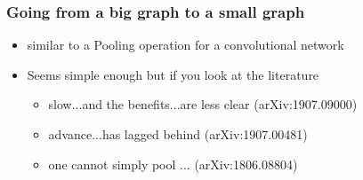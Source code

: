 \documentclass[hyperref={pdfpagelabels=false}]{beamer}
\begin{document}
\begin{frame}[label=Going from a big graph to a small graph]
\frametitle{Going from a big graph to a small graph}
\begin{itemize}

    \item similar to a Pooling operation for a convolutional network

    \item Seems simple enough but if you look at the literature

\begin{itemize}

    \item slow...and the benefits...are less clear (arXiv:1907.09000)

    \item advance...has lagged behind (arXiv:1907.00481)

    \item one cannot simply pool ... (arXiv:1806.08804)


\end{itemize}

\end{itemize}
\end{frame}
\end{document}
